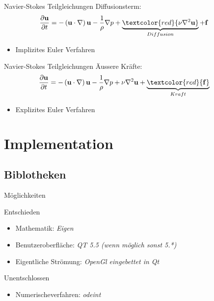 \documentclass[t]{beamer}
\begin{document}
\begin{frame}{Navier-Stokes Teilgleichungen}
	Diffusionsterm:
	\begin{align*}
 	 \frac{\partial \mathbf{u}}{\partial t} &= - \left( \mathbf{u} \cdot \nabla \right) \mathbf{u} - \frac{1}{\rho} \nabla p + \underbrace{\textcolor{red}{\nu \nabla^2 \mathbf{u}}}_{\substack{Diffusion}} + \mathbf{f}
	\end{align*}
	\begin{itemize}
	\item  Implizites Euler Verfahren
	\end{itemize}
\end{frame}

\begin{frame}{Navier-Stokes Teilgleichungen}
	\"Aussere Kr\"afte:
	\begin{align*}
 	 \frac{\partial \mathbf{u}}{\partial t} &= - \left( \mathbf{u} \cdot \nabla \right) \mathbf{u} - \frac{1}{\rho} \nabla p + \nu \nabla^2 \mathbf{u} + \underbrace{\textcolor{red}{\mathbf{f}}}_{\substack{Kraft}}
	\end{align*}
	\begin{itemize}
	\item  Explizites Euler Verfahren
	\end{itemize}
\end{frame}

\section{Implementation}
  \subsection{Biblotheken}
  \begin{frame}{M\"oglichkeiten}
  \begin{block}{Entschieden}
    \begin{itemize}
      \item Mathematik: \textit{Eigen}
      \item Benutzeroberfl\"ache: \textit{QT 5.5 (wenn m\"oglich sonst 5.*)} 
      \item Eigentliche Str\"omung: \textit{OpenGl eingebettet in Qt}
    \end{itemize}
  \end{block}
  \begin{block}{Unentschlossen}
    \begin{itemize}
      \item Numerischeverfahren: \textit{odeint}
    \end{itemize}
  \end{block}
    \end{frame}
\end{document}
